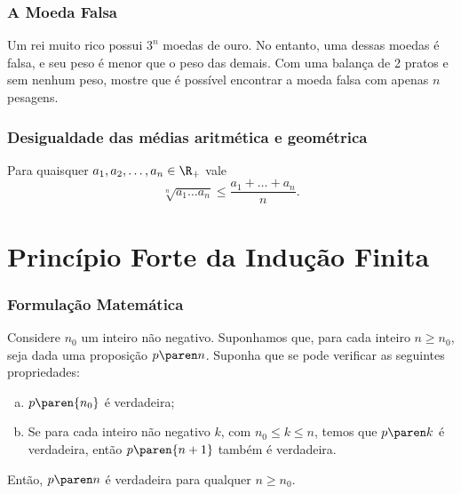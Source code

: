\documentclass[brazil, notheorems, 10pt]{beamer}
\begin{document}

\begin{frame}
\frametitle{A Moeda Falsa} %

\begin{Exem}
Um rei muito rico possui $3^n$ moedas de ouro. No entanto, uma dessas
moedas é falsa, e seu peso é menor que o peso das demais. Com uma
balança de 2 pratos e sem nenhum peso, mostre que é possível
encontrar a moeda falsa com apenas $n$ pesagens.
\end{Exem}

\end{frame}



\begin{frame}
\frametitle{Desigualdade das médias aritmética e geométrica} %

\begin{Teo}
Para quaisquer $a_1, a_2, \dots , a_n \in \R_+$ vale
\begin{equation}
		\sqrt[n]{a_1\dots a_n} \leq \frac {a_1 + \dots + a_n} n.
\end{equation}
\end{Teo}

\end{frame}
\section{Princípio Forte da Indução Finita}
\begin{frame}
\frametitle{Formulação Matemática} %


\begin{Teo}
Considere $n_0$ um inteiro não negativo. Suponhamos que, para cada
inteiro $n \geq n_0$, seja dada uma proposição $p \paren n$. Suponha
que se pode verificar as seguintes propriedades:
\begin{enumerate}[(a)]
	\item $p \paren{n_0}$ é verdadeira;
	\item Se para cada inteiro não negativo $k$, com $n_0 \leq k \leq n$, temos que
	 $p \paren k$ é verdadeira, então $p \paren {n+1}$ também
	é verdadeira.
\end{enumerate}
Então, $p \paren n$ é verdadeira para qualquer $n \geq n_0$.
\end{Teo}
\end{frame}
\end{document}
